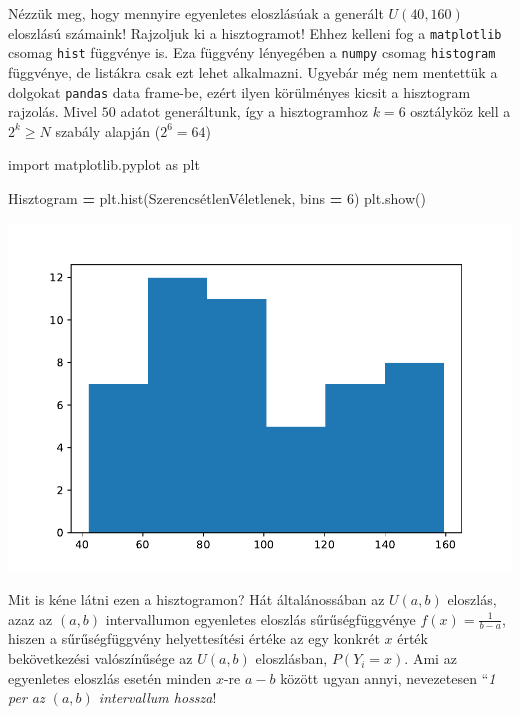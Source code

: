 \documentclass[
]{book}
\newenvironment{Shaded}{\begin{snugshade}}{\end{snugshade}}
\newcommand{\DecValTok}[1]{\textcolor[rgb]{0.00,0.00,0.81}{#1}}
\newcommand{\ImportTok}[1]{#1}
\newcommand{\NormalTok}[1]{#1}
\newcommand{\OperatorTok}[1]{\textcolor[rgb]{0.81,0.36,0.00}{\textbf{#1}}}
\begin{document}
Nézzük meg, hogy mennyire egyenletes eloszlásúak a generált \(U(40,160)\) eloszlású számaink! Rajzoljuk ki a hisztogramot!
Ehhez kelleni fog a \texttt{matplotlib} csomag \texttt{hist} függvénye is. Eza függvény lényegében a \texttt{numpy} csomag \texttt{histogram} függvénye, de listákra csak ezt lehet alkalmazni. Ugyebár még nem mentettük a dolgokat \texttt{pandas} data frame-be, ezért ilyen körülményes kicsit a hisztogram rajzolás.
Mivel \(50\) adatot generáltunk, így a hisztogramhoz \(k=6\) osztályköz kell a \(2^k \geq N\) szabály alapján (\(2^6=64\))

\begin{Shaded}
\begin{Highlighting}[]
\ImportTok{import}\NormalTok{ matplotlib.pyplot }\ImportTok{as}\NormalTok{ plt}

\NormalTok{Hisztogram }\OperatorTok{=}\NormalTok{ plt.hist(SzerencsétlenVéletlenek, bins }\OperatorTok{=} \DecValTok{6}\NormalTok{)}
\NormalTok{plt.show()}
\end{Highlighting}
\end{Shaded}

\includegraphics{_main_files/figure-latex/unnamed-chunk-205-3.pdf}

Mit is kéne látni ezen a hisztogramon? Hát általánossában az \(U(a,b)\) eloszlás, azaz az \((a,b)\) intervallumon egyenletes eloszlás sűrűségfüggvénye \(f(x) = \frac{1}{b-a}\), hiszen a sűrűségfüggvény helyettesítési értéke az egy konkrét \(x\) érték bekövetkezési valószínűsége az \(U(a,b)\) eloszlásban, \(P(Y_i=x)\). Ami az egyenletes eloszlás esetén minden \(x\)-re \(a-b\) között ugyan annyi, nevezetesen ``\emph{1 per az \((a,b)\) intervallum hossza}!
\end{document}
